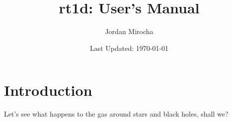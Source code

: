 \documentclass[letterpaper,titlepage,12pt]{article}
\numberwithin{equation}{section}
\begin{document}
    
\newcommand{\HI}{\text{HI}}
\newcommand{\HII}{\text{HII}}
\newcommand{\HeI}{\text{HeI}}
\newcommand{\HeII}{\text{HeII}}
\newcommand{\HeIII}{\text{HeIII}}
\newcommand{\nH}{n_{\text{H}}} 
\newcommand{\nHI}{n_{\text{HI}}} 
\newcommand{\nHII}{n_{\text{HII}}}  
\newcommand{\nHe}{n_{\text{He}}}
\newcommand{\xHI}{x_{\text{HI}}} 
\newcommand{\xHII}{x_{\text{HII}}} 
\newcommand{\xHeI}{x_{\text{HeI}}} 
\newcommand{\xHeII}{x_{\text{HeII}}} 
\newcommand{\xHeIII}{x_{\text{HeIII}}}  
\newcommand{\nHeI}{n_{\text{HeI}}}
\newcommand{\nHeII}{n_{\text{HeII}}}
\newcommand{\nHeIII}{n_{\text{HeIII}}}  
\newcommand{\nel}{n_{\text{e}}}  
\newcommand{\ntot}{n_{\text{tot}}}
\newcommand{\nnu}{$n_{\nu}$}
\newcommand{\ncol}{N_i}
\newcommand{\gHI}{\Gamma_{\text{HI}}}  
\newcommand{\gHeI}{\Gamma_{\text{HeI}}}
\newcommand{\gHeII}{\Gamma_{\text{HeII}}}
\newcommand{\aHII}{\alpha_{\text{HII}}}  
\newcommand{\aHeII}{\alpha_{\text{HeII}}}  
\newcommand{\aHeIII}{\alpha_{\text{HeIII}}}
\newcommand{\bHI}{\beta_{\text{HI}}} 
\newcommand{\bHeI}{\beta_{\text{HeI}}}  
\newcommand{\bHeII}{\beta_{\text{HeII}}}  
\newcommand{\xiHeII}{\xi_{\text{HeII}}}
\newcommand{\kB}{k_{\text{B}}}
\newcommand{\fheat}{f^{\text{heat}}}
\newcommand{\fheatE}{f_{(\nu - \nu_i)}^{\text{heat}}}
\newcommand{\fion}{f_i^{\text{ion}}}
\newcommand{\fionE}{f_{ij,(\nu - \nu_j)}^{\text{ion}}}
\newcommand{\Lbol}{\mathcal{L}_{\text{bol}}}
\newcommand{\spec}{\mathcal{N}}
\newcommand{\Heat}{\mathcal{H}}
\newcommand{\trec}{$t_{\text{rec}}$}
\newcommand{\Lbox}{L_{\mathrm{box}}}
\newcommand{\dx}{\Delta x}
\newcommand{\dd}{\text{d}}
\newcommand{\Htwo}{\mathrm{H}_2}
\newcommand{\drIF}{$\Delta r_{\mathrm{IF}}$}
\newcommand{\dTb}{$\delta T_b$}
\newcommand{\Nvec}{\mathbf{N}}
\newcommand{\sh}{\mathrm{sh}}
	
\author{Jordan Mirocha}	
	
\title{\Large {\bf rt1d: User's Manual}}
\date{Last Updated: \today}
\maketitle

\setcounter{tocdepth}{2}
\tableofcontents
\newpage

\section{Introduction}
Let's see what happens to the gas around stars and black holes, shall we?
\end{document}
